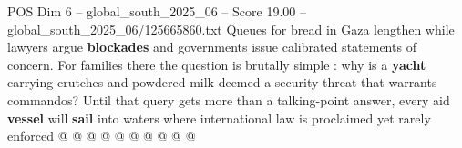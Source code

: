 \begin{textsample}{POS Dim 6 – global\_south\_2025\_06 – Score 19.00 – global\_south\_2025\_06/125665860.txt}
Queues for bread in Gaza lengthen while lawyers argue \textbf{blockades} and governments issue calibrated statements of concern.
For families there the question is brutally simple : why is a \textbf{yacht} carrying crutches and powdered milk deemed a security threat that warrants commandos?
Until that query gets more than a talking-point answer, every aid \textbf{vessel} will \textbf{sail} into waters where international law is proclaimed yet rarely enforced @ @ @ @ @ @ @ @ @ @

\end{textsample}
